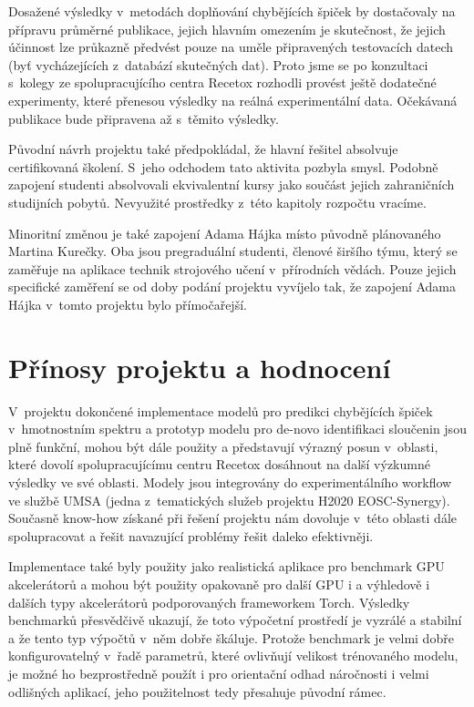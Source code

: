 \documentclass[a4paper,11pt]{article}
\begin{document}
Dosažené výsledky v~metodách doplňování chybějících špiček by dostačovaly na přípravu průměrné publikace,
jejich hlavním omezením je skutečnost, že jejich účinnost lze průkazně předvést pouze na uměle připravených
testovacích datech (byť vycházejících z~databází skutečných dat).
Proto jsme se po konzultaci s~kolegy ze spolupracujícího centra Recetox rozhodli provést ještě dodatečné
experimenty, které přenesou výsledky na reálná experimentální data.
Očekávaná publikace bude připravena až s~těmito výsledky.

Původní návrh projektu také předpokládal, že hlavní řešitel absolvuje certifikovaná školení.
S~jeho odchodem tato aktivita pozbyla smysl. Podobně zapojení studenti absolvovali ekvivalentní kursy
jako součást jejich zahraničních studijních pobytů.
Nevyužité prostředky z~této kapitoly rozpočtu vracíme.

Minoritní změnou je také zapojení Adama Hájka místo původně plánovaného Martina Kurečky.
Oba jsou pregraduální studenti, členové širšího týmu, který se zaměřuje na aplikace 
technik strojového učení v~přírodních vědách.
Pouze jejich specifické zaměření se od doby podání projektu vyvíjelo tak, že
zapojení Adama Hájka v~tomto projektu bylo přímočařejší.


\section{Přínosy projektu a hodnocení}



V~projektu dokončené implementace modelů pro predikci chybějících špiček v~hmotnostním spektru
a prototyp modelu pro de-novo identifikaci sloučenin jsou plně funkční, mohou být dále použity
a představují výrazný posun v~oblasti, které dovolí spolupracujícímu centru Recetox dosáhnout
na další výzkumné výsledky ve své oblasti.
Modely jsou integrovány do experimentálního workflow ve službě UMSA (jedna z~tematických služeb
projektu H2020 EOSC-Synergy).
Současně know-how získané při řešení projektu nám dovoluje v~této oblasti dále 
spolupracovat a řešit navazující problémy řešit daleko efektivněji.

Implementace také byly použity jako realistická aplikace pro benchmark GPU akcelerátorů 
a mohou být použity opakovaně pro další GPU i 
a výhledově i dalších typy akcelerátorů podporovaných frameworkem Torch.
Výsledky benchmarků přesvědčivě ukazují, že toto výpočetní prostředí je vyzrálé a stabilní
a že tento typ výpočtů v~něm dobře škáluje.
Protože benchmark je velmi dobře konfigurovatelný v~řadě parametrů, které 
ovlivňují velikost trénovaného modelu, je možné ho bezprostředně použít
i pro orientační odhad náročnosti i velmi odlišných aplikací, jeho použitelnost
tedy přesahuje původní rámec.
\end{document}
